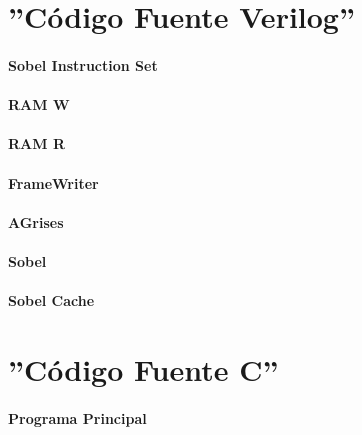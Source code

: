 \documentclass[a4paper,12pt,titlepage,final]{book}
\begin{document}
\appendix
\pagestyle{empty}
\appendixpage
\noappendicestocpagenum
\addappheadtotoc

\chapter{''Código Fuente Verilog''}
\subsubsection{Sobel Instruction Set}

\subsubsection{RAM W}

\subsubsection{RAM R}

\subsubsection{FrameWriter}

\subsubsection{AGrises}

\subsubsection{Sobel}

\subsubsection{Sobel Cache}


\chapter{''Código Fuente C''}
\subsubsection{Programa Principal}
\lstset{
language=c
}


\backmatter



\end{document}
